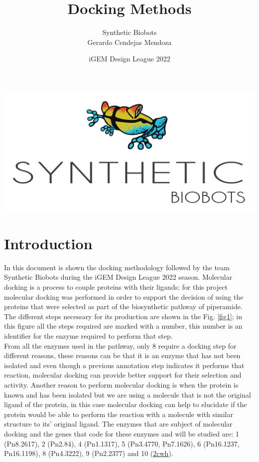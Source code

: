 \documentclass[12pt]{article}
\begin{document}
	
	\title {Docking Methods}
	\date{iGEM Design League 2022}
	\author{Synthetic Biobots\\Gerardo Cendejas Mendoza}
	
	\maketitle

	\begin{center}
		\includegraphics[scale=0.4]{SB.png}
	\end{center}

	\newpage
	
	\section*{Introduction}
	
	In this document is shown the docking methodology followed by the team  Synthetic Biobots during the iGEM Design League 2022 season. Molecular docking is a process to couple proteins with their ligands; for this project molecular docking was performed in order to support the decision of using the proteins that were selected as part of the biosynthetic pathway of piperamide. The different steps necessary for its production are shown in the Fig. \ref{fig1}; in this figure all the steps required are marked with a number, this number is an identifier for the enzyme required to perform that step.\\
	
	From all the enzymes used in the pathway, only 8 require a docking step for different reasons, these reasons can be that it is an enzyme that has not been isolated and even though a previous annotation step indicates it performs that reaction, molecular docking can provide better support for their selection and activity. Another reason to perform molecular docking is when the protein is known and has been isolated but we are using a molecule that is not the original ligand of the protein, in this case molecular docking can help to elucidate if the protein would be able to perform the reaction with a molecule with similar structure to its' original ligand. The enzymes that are subject of molecular docking and the genes that code for these enzymes and will be studied are: 1 (Pn8.2617), 2 (Pn2.84), 4 (Pn1.1317), 5 (Pn3.4770, Pn7.1626), 6 (Pn16.1237, Pn16.1198), 8 (Pn4.3222), 9 (Pn2.2377) and 10 (\href{https://www.rcsb.org/structure/2CWH}{2cwh}).\\
	
\end{document}
